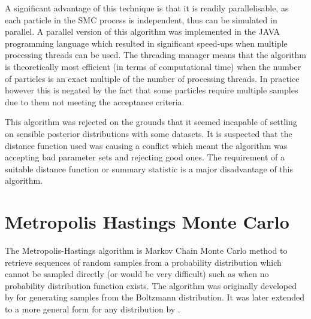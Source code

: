 A significant advantage of this technique is that it is readily parallelisable, as each particle in the SMC process is independent, thus can be simulated in parallel. A parallel version of this algorithm was implemented in the JAVA programming language which resulted in significant speed-ups when multiple processing threads can be used. The threading manager means that the algorithm is theoretically most efficient (in terms of computational time) when the number of particles is an exact multiple of the number of processing threads. In practice however this is negated by the fact that some particles require multiple samples due to them not meeting the acceptance criteria.


This algorithm was rejected on the grounds that it seemed incapable of settling on sensible posterior distributions with some datasets. It is suspected that the distance function used was causing a conflict which meant the algorithm was accepting bad parameter sets and rejecting good ones. The requirement of a suitable distance function or summary statistic is a major disadvantage of this algorithm.

\section{Metropolis Hastings Monte Carlo}

The Metropolis-Hastings algorithm is Markov Chain Monte Carlo method to retrieve sequences of random samples from a probability distribution which cannot be sampled directly (or would be very difficult) such as when no probability distribution function exists. The algorithm was originally developed by \citet{Metropolis1953} for generating samples from the Boltzmann distribution. It was later extended to a more general form for any distribution by \citet{Hastings1970}.

